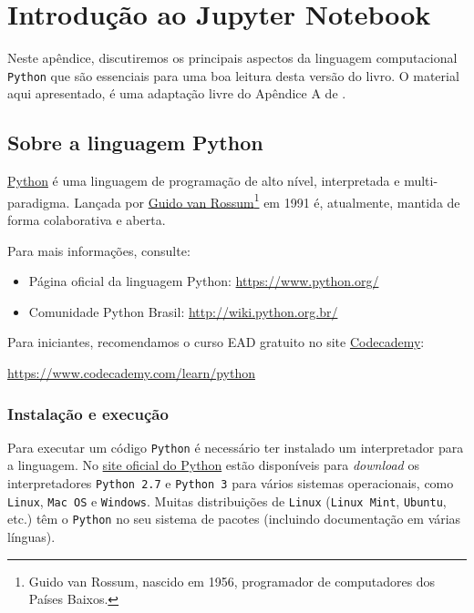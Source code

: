 
\chapter{Introdução ao Jupyter Notebook}\label{cap:jupyter}

Neste apêndice, discutiremos os principais aspectos da linguagem computacional \verb+Python+ que são essenciais para uma boa leitura desta versão do livro. O material aqui apresentado, é uma adaptação livre do Apêndice A de \cite{CALSCI}.

\section{Sobre a linguagem Python}

\href{https://www.python.org/}{Python} é uma linguagem de programação de alto nível, interpretada e multi-paradigma. Lançada por \href{https://gvanrossum.github.io//}{Guido van Rossum}\footnote{Guido van Rossum, nascido em 1956, programador de computadores dos Países Baixos.} em 1991 é, atualmente, mantida de forma colaborativa e aberta.

Para mais informações, consulte:
\begin{itemize}
\item Página oficial da linguagem Python: \url{https://www.python.org/}
\item Comunidade Python Brasil: \url{http://wiki.python.org.br/}
\end{itemize}

Para iniciantes, recomendamos o curso EAD gratuito no site \href{https://www.codecademy.com/}{Codecademy}:
\begin{center}
  \url{https://www.codecademy.com/learn/python}
\end{center}

\subsection{Instalação e execução}

Para executar um código \verb+Python+ é necessário ter instalado um interpretador para a linguagem. No \href{https://www.python.org/}{site oficial do Python} estão disponíveis para {\it download} os interpretadores \verb+Python 2.7+ e \verb+Python 3+ para vários sistemas operacionais, como \verb+Linux+, \verb+Mac OS+ e \verb+Windows+. Muitas distribuições de \verb+Linux+ (\verb+Linux Mint+, \verb+Ubuntu+, etc.) têm o \verb+Python+ no seu sistema de pacotes (incluindo documentação em várias línguas).


